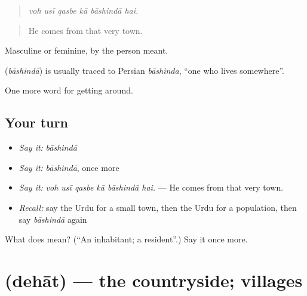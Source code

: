 \begin{quote}
     
\end{quote}

\begin{quote}
\emph{voh usī qasbe kā bāshindā hai.}
\end{quote}

\begin{quote}
He comes from that very town.
\end{quote}

Masculine or feminine, by the person meant.

\begin{cousinweb}
\textbf{} (\emph{bāshindā}) is usually traced to Persian \emph{bāshinda}, \textquotedblleft{}one who lives somewhere\textquotedblright{}.
\end{cousinweb}

\begin{grammarlens}[title={What you've built}]
One more word for getting around.
\end{grammarlens}

\subsection*{Your turn}
\begin{itemize}
\raggedright
  \item \emph{Say it:} \emph{bāshindā}
  \item \emph{Say it:} \emph{bāshindā}, once more
  \item \emph{Say it:} \emph{voh usī qasbe kā bāshindā hai.} — He comes from that very town.
  \item \emph{Recall:} say the Urdu for a small town, then the Urdu for a population, then say \emph{bāshindā} again
\end{itemize}

\begin{tcolorbox}[breakable,colback=teal!4,colframe=teal!35!black,title={Before you move on}]
What does  mean? (\textquotedblleft{}An inhabitant; a resident\textquotedblright{}.) Say it once more.
\end{tcolorbox}
\section[\texorpdfstring{\ur{دیہات} (dehāt)}{دیہات (dehāt)}]{ (dehāt) — the countryside; villages}

\label{lesson:UR-C412-dehat}



